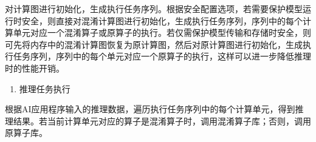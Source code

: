 \documentclass[letterpaper,10pt,english]{sphinxmanual}
\begin{document}
\sphinxAtStartPar
对计算图进行初始化，生成执行任务序列。根据安全配置选项，若需要保护模型运行时安全，则直接对混淆计算图进行初始化，生成执行任务序列，序列中的每个计算单元对应一个混淆算子或原算子的执行。若仅需保护模型传输和存储时安全，则可先将内存中的混淆计算图恢复为原计算图，然后对原计算图进行初始化，生成执行任务序列，序列中的每个单元对应一个原算子的执行，这样可以进一步降低推理时的性能开销。
\begin{enumerate}
%
\setcounter{enumi}{9}
\item {} 
\sphinxAtStartPar
推理任务执行

\end{enumerate}

\sphinxAtStartPar
根据AI应用程序输入的推理数据，遍历执行任务序列中的每个计算单元，得到推理结果。若当前计算单元对应的算子是混淆算子时，调用混淆算子库；否则，调用原算子库。
\end{document}
